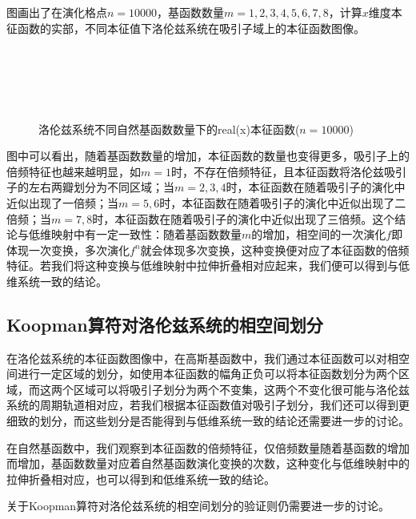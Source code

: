 图\label{fig:lorenz_eig_natural_real}画出了在演化格点$n=10000$，基函数数量$m=1,2,3,4,5,6,7,8$，计算$x$维度本征函数的实部，不同本征值下洛伦兹系统在吸引子域上的本征函数图像。

\begin{figure}
    \centering
    \\
    \\
    \\
    \\
    \caption{洛伦兹系统不同自然基函数数量下的real(x)本征函数($n=10000$)}\label{fig:lorenz_eig_natural_real}
\end{figure}

图\label{fig:lorenz_eig_natural_real}中可以看出，随着基函数数量的增加，本征函数的数量也变得更多，吸引子上的倍频特征也越来越明显，如$m=1$时，不存在倍频特征，且本征函数将洛伦兹吸引子的左右两瓣划分为不同区域；当$m=2,3,4$时，本征函数在随着吸引子的演化中近似出现了一倍频；当$m=5,6$时，本征函数在随着吸引子的演化中近似出现了二倍频；当$m=7,8$时，本征函数在随着吸引子的演化中近似出现了三倍频。这个结论与低维映射中有一定一致性：随着基函数数量$m$的增加，相空间的一次演化$f$即体现一次变换，多次演化$f^n$就会体现多次变换，这种变换便对应了本征函数的倍频特征。若我们将这种变换与低维映射中拉伸折叠相对应起来，我们便可以得到与低维系统一致的结论。

\subsection{Koopman算符对洛伦兹系统的相空间划分}

在洛伦兹系统的本征函数图像中，在高斯基函数中，我们通过本征函数可以对相空间进行一定区域的划分，如使用本征函数的幅角正负可以将本征函数划分为两个区域，而这两个区域可以将吸引子划分为两个不变集，这两个不变化很可能与洛伦兹系统的周期轨道相对应，若我们根据本征函数值对吸引子划分，我们还可以得到更细致的划分，而这些划分是否能得到与低维系统一致的结论还需要进一步的讨论。

在自然基函数中，我们观察到本征函数的倍频特征，仅倍频数量随着基函数的增加而增加，基函数数量对应着自然基函数演化变换的次数，这种变化与低维映射中的拉伸折叠相对应，也可以得到和低维系统一致的结论。

关于Koopman算符对洛伦兹系统的相空间划分的验证则仍需要进一步的讨论。